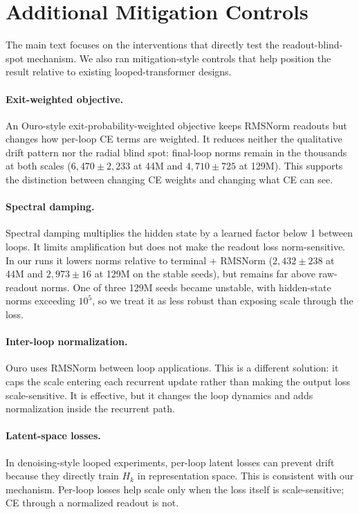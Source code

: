 \section{Additional Mitigation Controls}
\label{app:mitigations}

The main text focuses on the interventions that directly test the readout-blind-spot mechanism.
We also ran mitigation-style controls that help position the result relative to existing looped-transformer designs.

\paragraph{Exit-weighted objective.}
An Ouro-style exit-probability-weighted objective keeps RMSNorm readouts but changes how per-loop CE terms are weighted.
It reduces neither the qualitative drift pattern nor the radial blind spot: final-loop norms remain in the thousands at both scales ($6{,}470 \pm 2{,}233$ at 44M and $4{,}710 \pm 725$ at 129M).
This supports the distinction between changing CE weights and changing what CE can see.

\paragraph{Spectral damping.}
Spectral damping multiplies the hidden state by a learned factor below 1 between loops.
It limits amplification but does not make the readout loss norm-sensitive.
In our runs it lowers norms relative to terminal + RMSNorm ($2{,}432 \pm 238$ at 44M and $2{,}973 \pm 16$ at 129M on the stable seeds), but remains far above raw-readout norms.
One of three 129M seeds became unstable, with hidden-state norms exceeding $10^5$, so we treat it as less robust than exposing scale through the loss.

\paragraph{Inter-loop normalization.}
Ouro uses RMSNorm between loop applications.
This is a different solution: it caps the scale entering each recurrent update rather than making the output loss scale-sensitive.
It is effective, but it changes the loop dynamics and adds normalization inside the recurrent path.

\paragraph{Latent-space losses.}
In denoising-style looped experiments, per-loop latent losses can prevent drift because they directly train $H_k$ in representation space.
This is consistent with our mechanism.
Per-loop losses help scale only when the loss itself is scale-sensitive; CE through a normalized readout is not.


